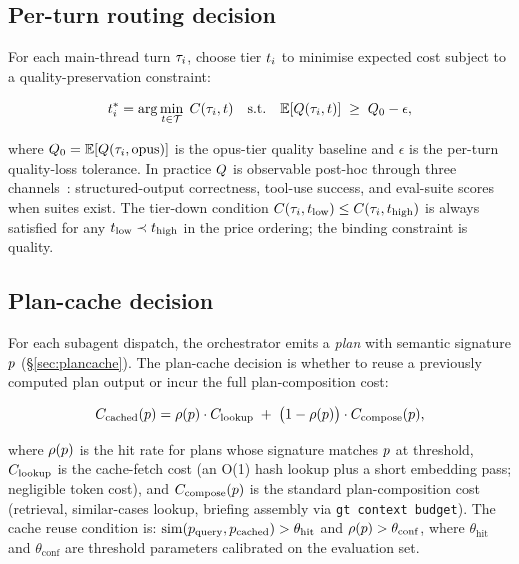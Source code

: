 \subsection{Per-turn routing decision}

For each main-thread turn \(\tau_i\), choose tier \(t_i\) to
minimise expected cost subject to a quality-preservation constraint:

\begin{equation}
  t_i^{*} = \arg\min_{t \in \mathcal{T}}\; C(\tau_i, t)
  \quad \text{s.t.} \quad
  \mathbb{E}[Q(\tau_i, t)] \;\geq\; Q_0 - \epsilon,
  \label{eq:routing}
\end{equation}

where \(Q_0 = \mathbb{E}[Q(\tau_i, \text{opus})]\) is
the opus-tier quality baseline and \(\epsilon\) is the
per-turn quality-loss tolerance.  In practice \(Q\) is
observable post-hoc through three channels~\cite{moa1landscape}:
structured-output correctness, tool-use success, and eval-suite scores
when suites exist.  The tier-down condition
\(C(\tau_i, t_{\text{low}}) \leq C(\tau_i, t_{\text{high}})\)
is always satisfied for any \(t_{\text{low}} \prec t_{\text{high}}\)
in the price ordering; the binding constraint is quality.

\subsection{Plan-cache decision}

For each subagent dispatch, the orchestrator emits a \emph{plan}
with semantic signature \(p\) (§\ref{sec:plancache}).  The
plan-cache decision is whether to reuse a previously computed plan
output or incur the full plan-composition cost:

\begin{equation}
  C_{\text{cached}}(p) =
    \rho(p) \cdot C_{\text{lookup}} \;+\;
    \bigl(1 - \rho(p)\bigr) \cdot C_{\text{compose}}(p),
  \label{eq:plancache}
\end{equation}

where \(\rho(p)\) is the hit rate for plans whose signature
matches \(p\) at threshold, \(C_{\text{lookup}}\) is the
cache-fetch cost (an O(1) hash lookup plus a short
embedding pass; negligible token cost), and
\(C_{\text{compose}}(p)\) is the standard plan-composition
cost (retrieval, similar-cases lookup, briefing assembly via
\texttt{gt context budget}).  The cache reuse condition is:
\(\operatorname{sim}(p_{\text{query}}, p_{\text{cached}}) > \theta_{\text{hit}}\)
and \(\rho(p) > \theta_{\text{conf}}\), where
\(\theta_{\text{hit}}\) and \(\theta_{\text{conf}}\) are threshold
parameters calibrated on the evaluation set.

